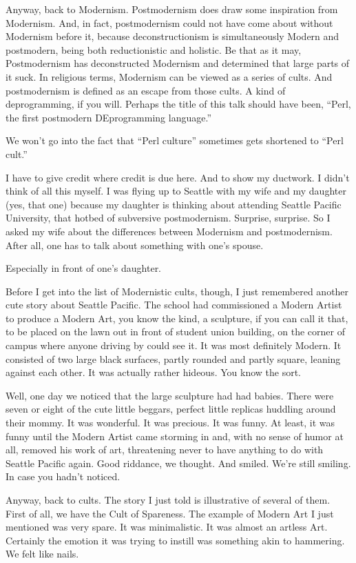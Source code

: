 Anyway, back to Modernism. Postmodernism does draw some inspiration from
Modernism. And, in fact, postmodernism could not have come about without
Modernism before it, because deconstructionism is simultaneously Modern and
postmodern, being both reductionistic and holistic. Be that as it may,
Postmodernism has deconstructed Modernism and determined that large parts of
it suck. In religious terms, Modernism can be viewed as a series of cults.
And postmodernism is defined as an escape from those cults. A kind of
deprogramming, if you will. Perhaps the title of this talk should have been,
``Perl, the first postmodern DEprogramming language.''

We won't go into the fact that ``Perl culture'' sometimes gets shortened to
``Perl cult.''

I have to give credit where credit is due here. And to show my ductwork. I
didn't think of all this myself. I was flying up to Seattle with my wife and
my daughter (yes, that one) because my daughter is thinking about attending
Seattle Pacific University, that hotbed of subversive postmodernism.
Surprise, surprise. So I asked my wife about the differences between
Modernism and postmodernism. After all, one has to talk about something with
one's spouse.

Especially in front of one's daughter.

Before I get into the list of Modernistic cults, though, I just remembered
another cute story about Seattle Pacific. The school had commissioned a
Modern Artist to produce a Modern Art, you know the kind, a sculpture, if you
can call it that, to be placed on the lawn out in front of student union
building, on the corner of campus where anyone driving by could see it. It
was most definitely Modern. It consisted of two large black surfaces, partly
rounded and partly square, leaning against each other. It was actually rather
hideous. You know the sort.

Well, one day we noticed that the large sculpture had had babies. There were
seven or eight of the cute little beggars, perfect little replicas huddling
around their mommy. It was wonderful. It was precious. It was funny. At
least, it was funny until the Modern Artist came storming in and, with no
sense of humor at all, removed his work of art, threatening never to have
anything to do with Seattle Pacific again. Good riddance, we thought. And
smiled. We're still smiling. In case you hadn't noticed.

Anyway, back to cults. The story I just told is illustrative of several of
them. First of all, we have the Cult of Spareness. The example of Modern Art
I just mentioned was very spare. It was minimalistic. It was almost an
artless Art. Certainly the emotion it was trying to instill was something
akin to hammering. We felt like nails.

